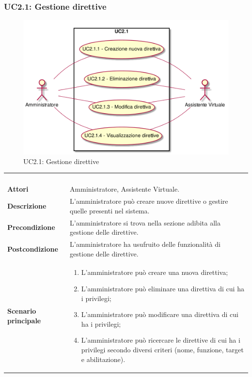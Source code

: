 \newpage\subsubsection{UC2.1: Gestione direttive}
\label{UC2.1}
\begin{figure}[h]
	\centering
	\includegraphics[width=\textwidth,height=\textheight,keepaspectratio]{images/UseCaseUC21.png}
	\caption{UC2.1: Gestione direttive}
\end{figure}
\begin{longtable}{l|p{10cm}}
	\rowcolor[gray]{0.8} \multicolumn{2}{c}{} \\
	\rowcolor[gray]{0.8} \multicolumn{2}{c}{\textbf{UC2.1 - Gestione direttive}} \\
	\rowcolor[gray]{0.8} \multicolumn{2}{c}{} \\
	\hline
	&\\
	\textbf{Attori} & Amministratore, Assistente Virtuale.\\[7pt]
	\textbf{Descrizione} & L'amministratore può creare nuove direttive o gestire quelle presenti nel sistema.\\[7pt]
	\textbf{Precondizione} & L'amministratore si trova nella sezione adibita alla gestione delle direttive.\\[7pt]
	\textbf{Postcondizione} & L'amministratore ha usufruito delle funzionalità di gestione delle direttive.\\[7pt]
	\textbf{Scenario principale} &\begin{enumerate}
		\item  L'amministratore può creare una nuova direttiva;
		\item  L'amministratore può eliminare una direttiva di cui ha i privilegi;
		\item  L'amministratore può modificare una direttiva di cui ha i privilegi;
		\item  L'amministratore può ricercare le direttive di cui ha i privilegi secondo diversi criteri (nome, funzione, target e abilitazione).
	\end{enumerate}
	\\[7pt]\hline
\end{longtable}

